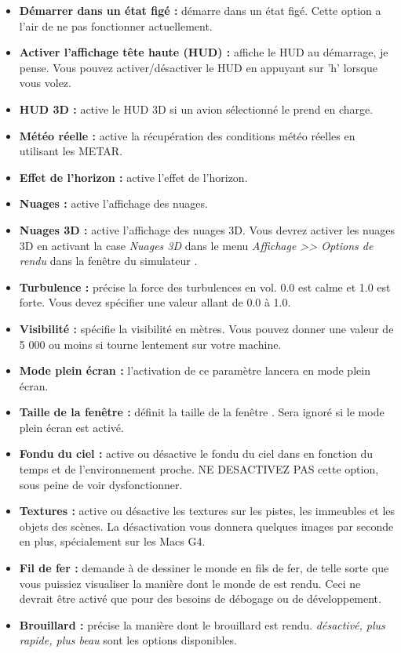 {\begin{itemize}
\item \textbf{D\'{e}marrer dans un \'{e}tat fig\'{e} :} d\'{e}marre \FlightGear{} dans un \'{e}tat fig\'{e}. Cette option a l'air de ne pas fonctionner actuellement.
\item \textbf{Activer l'affichage t\^{e}te haute (HUD) :} affiche le HUD au d\'{e}marrage, je pense. Vous pouvez activer/d\'{e}sactiver le HUD en appuyant sur 'h' lorsque vous volez.
\item \textbf{HUD 3D :} active le HUD 3D si un avion s\'{e}lectionn\'{e} le prend en charge.
\item \textbf{M\'{e}t\'{e}o r\'{e}elle :} active la r\'{e}cup\'{e}ration des conditions m\'{e}t\'{e}o r\'{e}elles en utilisant les METAR.
\item \textbf{Effet de l'horizon :} active l'effet de l'horizon.
\item \textbf{Nuages :} active l'affichage des nuages.
\item \textbf{Nuages 3D :} active l'affichage des nuages 3D. Vous devrez activer les nuages 3D en activant la case \textit{Nuages 3D} dans le menu \textit{Affichage >> Options de rendu} dans la fen\^{e}tre du simulateur \FlightGear{}.
\item \textbf{Turbulence :} pr\'{e}cise la force des turbulences en vol. 0.0 est calme et 1.0 est forte. Vous devez sp\'{e}cifier une valeur allant de 0.0 \`{a} 1.0.
\item \textbf{Visibilit\'{e} :} sp\'{e}cifie la visibilit\'{e} en m\`{e}tres. Vous pouvez donner une valeur de 5 000 ou moins si \FlightGear{} tourne lentement sur votre machine.
\item \textbf{Mode plein \'{e}cran :} l'activation de ce param\`{e}tre lancera \FlightGear{} en mode plein \'{e}cran.
\item \textbf{Taille de la fen\^{e}tre :} d\'{e}finit la taille de la fen\^{e}tre \FlightGear{}. Sera ignor\'{e} si le mode plein \'{e}cran est activ\'{e}.
\item \textbf{Fondu du ciel :} active ou d\'{e}sactive le fondu du ciel dans \FlightGear{} en fonction du temps et de l'environnement proche. NE DESACTIVEZ PAS cette option, sous peine de voir \FlightGear{} dysfonctionner.
\item \textbf{Textures :} active ou d\'{e}sactive les textures sur les pistes, les immeubles et les objets des sc\`{e}nes. La d\'{e}sactivation vous donnera quelques images par seconde en plus, sp\'{e}cialement sur les Macs G4.
\item \textbf{Fil de fer :} demande \`{a} \FlightGear{} de dessiner le monde en fils de fer, de telle sorte que vous puissiez visualiser la mani\`{e}re dont le monde de \FlightGear{} est rendu. Ceci ne devrait \^{e}tre activ\'{e} que pour des besoins de d\'{e}bogage ou de d\'{e}veloppement.
\item \textbf{Brouillard :} pr\'{e}cise la mani\`{e}re dont le brouillard est rendu. \textit{d\'{e}sactiv\'{e}, plus rapide, plus beau} sont les options disponibles.
\end{itemize}
}{}

